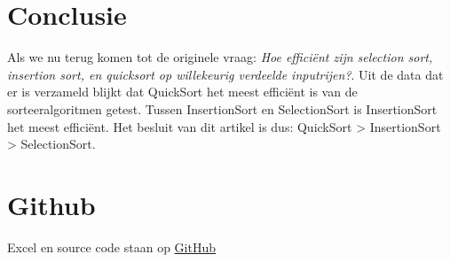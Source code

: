 \section{Conclusie}

Als we nu terug komen tot de originele vraag: \textit{Hoe efficiënt zijn selection sort, insertion sort, en quicksort op willekeurig verdeelde inputrijen?}. Uit de data dat er is verzameld blijkt dat QuickSort het meest efficiënt is van de sorteeralgoritmen getest. Tussen InsertionSort en SelectionSort is InsertionSort het meest efficiënt. Het besluit van dit artikel is dus: QuickSort > InsertionSort > SelectionSort.

\section{Github}
Excel en source code staan op \href{https://www.github.com/norpie-dev/gna-practicum1}{GitHub}
